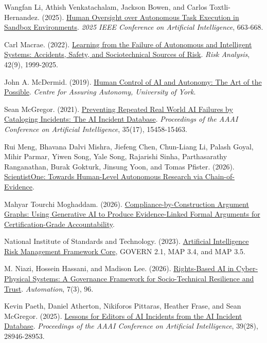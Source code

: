 \documentclass[11pt]{article}
\newenvironment{TAEReferences}{%
  \begin{list}{}{%
    \renewcommand{\makelabel}[1]{}%
    \setlength{\labelwidth}{0pt}%
    \setlength{\labelsep}{0pt}%
    \setlength{\leftmargin}{0.5in}%
    \setlength{\itemindent}{-0.5in}%
    \setlength{\itemsep}{0.45em}%
    \setlength{\parsep}{0pt}%
    \setlength{\topsep}{0.25em}%
  }%
}{\end{list}}
\begin{document}
\begin{TAEReferences}
\item Wangfan Li, Athish Venkatachalam, Jackson Bowen, and Carlos Toxtli-Hernandez. (2025). \href{https://doi.org/10.1109/CAI64502.2025.00121}{Human Oversight over Autonomous Task Execution in Sandbox Environments}. \emph{2025 IEEE Conference on Artificial Intelligence}, 663-668.
\item Carl Macrae. (2022). \href{https://doi.org/10.1111/risa.13850}{Learning from the Failure of Autonomous and Intelligent Systems: Accidents, Safety, and Sociotechnical Sources of Risk}. \emph{Risk Analysis}, 42(9), 1999-2025.
\item John A. McDermid. (2019). \href{https://www.york.ac.uk/assuring-autonomy/news/blog/human-control-ai-autonomy/}{Human Control of AI and Autonomy: The Art of the Possible}. \emph{Centre for Assuring Autonomy, University of York}.
\item Sean McGregor. (2021). \href{https://doi.org/10.1609/aaai.v35i17.17817}{Preventing Repeated Real World AI Failures by Cataloging Incidents: The AI Incident Database}. \emph{Proceedings of the AAAI Conference on Artificial Intelligence}, 35(17), 15458-15463.
\item Rui Meng, Bhavana Dalvi Mishra, Jiefeng Chen, Chun-Liang Li, Palash Goyal, Mihir Parmar, Yiwen Song, Yale Song, Rajarishi Sinha, Parthasarathy Ranganathan, Burak Gokturk, Jinsung Yoon, and Tomas Pfister. (2026). \href{https://doi.org/10.48550/arXiv.2605.26340}{ScientistOne: Towards Human-Level Autonomous Research via Chain-of-Evidence}.
\item Mahyar Tourchi Moghaddam. (2026). \href{https://doi.org/10.48550/arXiv.2604.04103}{Compliance-by-Construction Argument Graphs: Using Generative AI to Produce Evidence-Linked Formal Arguments for Certification-Grade Accountability}.
\item National Institute of Standards and Technology. (2023). \href{https://airc.nist.gov/airmf-resources/airmf/5-sec-core/}{Artificial Intelligence Risk Management Framework Core}, GOVERN 2.1, MAP 3.4, and MAP 3.5.
\item M. Niazi, Hossein Hassani, and Madison Lee. (2026). \href{https://doi.org/10.3390/automation7030096}{Rights-Based AI in Cyber-Physical Systems: A Governance Framework for Socio-Technical Resilience and Trust}. \emph{Automation}, 7(3), 96.
\item Kevin Paeth, Daniel Atherton, Nikiforos Pittaras, Heather Frase, and Sean McGregor. (2025). \href{https://doi.org/10.1609/aaai.v39i28.35163}{Lessons for Editors of AI Incidents from the AI Incident Database}. \emph{Proceedings of the AAAI Conference on Artificial Intelligence}, 39(28), 28946-28953.

\end{TAEReferences}
\end{document}
